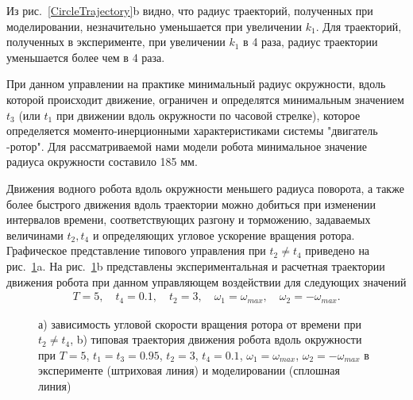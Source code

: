 Из рис.~\ref{CircleTrajectory}b видно, что радиус траекторий, полученных при моделировании, незначительно уменьшается при увеличении $k_1$. Для траекторий, полученных в эксперименте, при увеличении $k_1$ в 4 раза, радиус траектории уменьшается более чем в 4 раза.

При данном управлении на практике минимальный радиус окружности, вдоль которой происходит движение, ограничен и определятся минимальным значением $t_3$ (или $t_1$ при движении вдоль окружности по часовой стрелке), которое определяется моменто-инерционными характеристиками системы  "двигатель -ротор". Для рассматриваемой нами модели робота минимальное значение радиуса окружности составило 185 мм.

Движения водного робота вдоль окружности меньшего радиуса поворота, а также более быстрого движения вдоль траектории можно добиться при изменении интервалов времени, соответствующих разгону и торможению, задаваемых величинами $t_2, t_4$ и определяющих угловое ускорение вращения ротора. Графическое представление типового управления при $t_2 \neq t_4$ приведено на рис.~\ref{ControlActionOur}a. На рис.~\ref{ControlActionOur}b представлены экспериментальная и расчетная траектории движения робота при данном управляющем воздействии для следующих значений
\begin{gather}
T=5,\quad t_4 = 0.1,\quad t_2 = 3,\quad \omega_1 = \omega_{max},\quad \omega_2 = -\omega_{max}.
\end{gather}

\begin{figure}[!ht]
	\begin{minipage}[h]{0.5\linewidth}
	\end{minipage}
	\hfill
	\begin{minipage}[h]{0.5\linewidth}
	\end{minipage}
	\caption{а) зависимость угловой скорости вращения ротора от времени при $t_2  \neq t_4$, b) типовая траектория движения робота вдоль окружности при $T = 5$, $t_1 = t_3 = 0.95$, $t_2 = 3$, $t_4 = 0.1$, $\omega_1 = \omega_{max}$, $\omega_2 = -\omega_{max}$ в эксперименте (штриховая линия) и моделировании (сплошная линия)}
	\label{ControlActionOur}
\end{figure}

